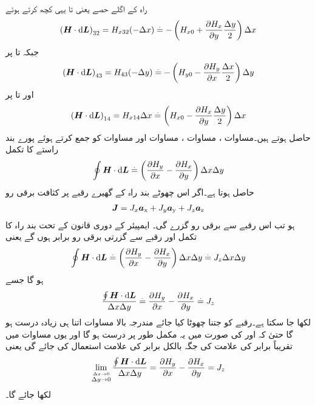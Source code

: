 راہ کے اگلے حصے یعنی  تا  یہی کچھ کرتے ہوئے
\begin{align}\label{مساوات_مقناطیسی_پہلے_حصہ_تکمل_ب}
\left( \kvec{H} \cdot \dif \kvec{L}\right)_{32}=H_{x32}(-\Delta x) \overset{.}{=}-\left(H_{x0}+\frac{\partial H_x}{\partial y} \frac{\Delta y}{2} \right)\Delta x 
\end{align}
جبکہ  تا  پر
\begin{align}\label{مساوات_مقناطیسی_پہلے_حصہ_تکمل_پ}
\left( \kvec{H} \cdot \dif \kvec{L}\right)_{43}=H_{43}(-\Delta y)\overset{.}{=}-\left(H_{y0}-\frac{\partial H_y}{\partial x} \frac{\Delta x}{2} \right)\Delta y 
\end{align}
اور  تا  پر
\begin{align}\label{مساوات_مقناطیسی_پہلے_حصہ_تکمل_ت}
\left( \kvec{H} \cdot \dif \kvec{L}\right)_{14}=H_{x14}\Delta x \overset{.}{=}\left(H_{x0}-\frac{\partial H_x}{\partial y} \frac{\Delta y}{2} \right)\Delta x 
\end{align}
حاصل ہوتے ہیں۔مساوات  ، مساوات ، مساوات  اور مساوات  کو جمع کرتے ہوئے پورے بند راستے کا تکمل
\begin{align}
\oint \kvec{H} \cdot \dif \kvec{L}\overset{.}{=}\left(\frac{\partial H_y}{\partial x}-\frac{\partial H_x}{\partial y} \right)\Delta x \Delta y
\end{align}
حاصل ہوتا ہے۔اگر اس چھوٹے بند راہ کے گھیرے رقبے پر کثافت برقی رو
\begin{align*}
{\ensuremath{{\boldsymbol{J}}}}=J_x {\boldsymbol{a}}_{\textup{x}}+J_y{\boldsymbol{a}}_{\textup{y}}+J_z {\boldsymbol{a}}_{\textup{z}}
\end{align*}
ہو تب اس رقبے سے  برقی رو گزرے گی۔ ایمپیئر کے دوری قانون کے تحت بند راہ کا تکمل اور رقبے سے گزرتی برقی رو برابر ہوں گے یعنی
\begin{align*}
\oint \kvec{H} \cdot \dif \kvec{L}\overset{.}{=}\left(\frac{\partial H_y}{\partial x}-\frac{\partial H_x}{\partial y} \right)\Delta x \Delta y\overset{.}{=}J_z \Delta x \Delta y
\end{align*}
ہو گا جسے
\begin{align*}
\frac{\oint \kvec{H} \cdot \dif \kvec{L}}{\Delta x \Delta y}\overset{.}{=}\frac{\partial H_y}{\partial x}-\frac{\partial H_x}{\partial y}\overset{.}{=}J_z
\end{align*}
لکھا جا سکتا ہے۔رقبے کو جتنا چھوٹا کیا جائے مندرجہ بالا مساوات اتنا ہی زیادہ درست ہو گا حتیٰ کہ  اور  کی صورت میں یہ مکمل طور پر درست ہو گا اور یوں مساوات میں تقریباً برابر کی علامت  کی جگہ بالکل برابر  کی علامت استعمال کی جائے گی یعنی
\begin{align}\label{مساوات_مقناطیسی_گردش_الف}
\lim_{\overset{\Delta x \to 0}{\Delta y \to 0}}\frac{\oint \kvec{H} \cdot \dif \kvec{L}}{\Delta x \Delta y}=\frac{\partial H_y}{\partial x}-\frac{\partial H_x}{\partial y}=J_z
\end{align}
لکھا جائے گا۔

